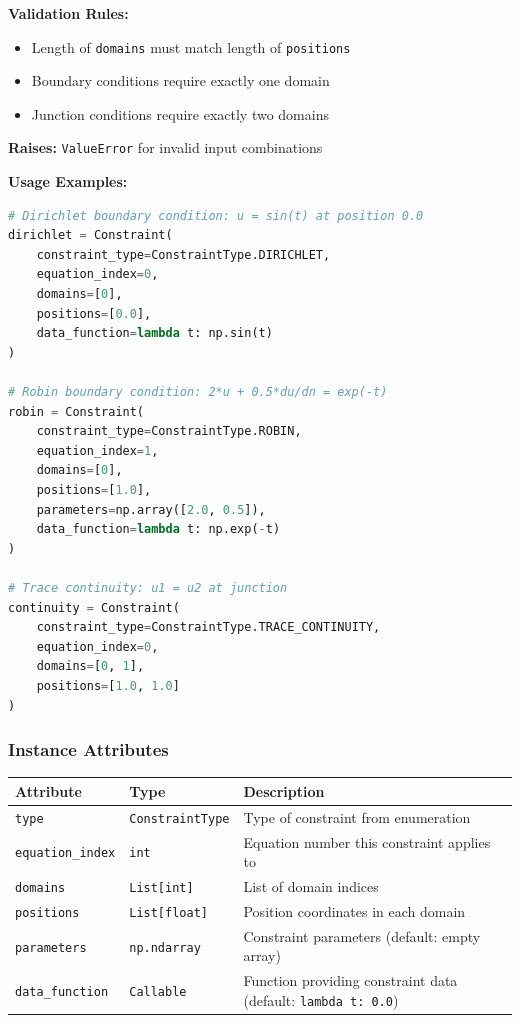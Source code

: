 \textbf{Validation Rules:}
\begin{itemize}
    \item Length of \texttt{domains} must match length of \texttt{positions}
    \item Boundary conditions require exactly one domain
    \item Junction conditions require exactly two domains
\end{itemize}

\textbf{Raises:} \texttt{ValueError} for invalid input combinations

\textbf{Usage Examples:}
\begin{lstlisting}[language=Python, caption=Constraint Constructor Usage]
# Dirichlet boundary condition: u = sin(t) at position 0.0
dirichlet = Constraint(
    constraint_type=ConstraintType.DIRICHLET,
    equation_index=0,
    domains=[0],
    positions=[0.0],
    data_function=lambda t: np.sin(t)
)

# Robin boundary condition: 2*u + 0.5*du/dn = exp(-t)
robin = Constraint(
    constraint_type=ConstraintType.ROBIN,
    equation_index=1,
    domains=[0],
    positions=[1.0],
    parameters=np.array([2.0, 0.5]),
    data_function=lambda t: np.exp(-t)
)

# Trace continuity: u1 = u2 at junction
continuity = Constraint(
    constraint_type=ConstraintType.TRACE_CONTINUITY,
    equation_index=0,
    domains=[0, 1],
    positions=[1.0, 1.0]
)
\end{lstlisting}

\subsubsection{Instance Attributes}

\begin{longtable}{|p{3.2cm}|p{3cm}|p{7cm}|}
\hline
\textbf{Attribute} & \textbf{Type} & \textbf{Description} \\
\hline
\endhead

\texttt{type} & \texttt{ConstraintType} & Type of constraint from enumeration \\
\hline

\texttt{equation\_index} & \texttt{int} & Equation number this constraint applies to \\
\hline

\texttt{domains} & \texttt{List[int]} & List of domain indices \\
\hline

\texttt{positions} & \texttt{List[float]} & Position coordinates in each domain \\
\hline

\texttt{parameters} & \texttt{np.ndarray} & Constraint parameters (default: empty array) \\
\hline

\texttt{data\_function} & \texttt{Callable} & Function providing constraint data (default: \texttt{lambda t: 0.0}) \\
\hline

\end{longtable}

